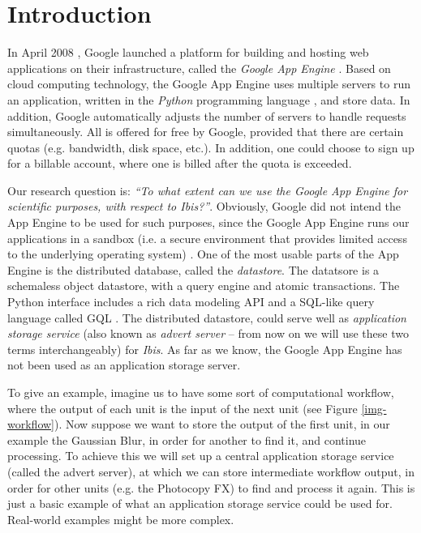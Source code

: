\section{Introduction}
\label{introduction}
In April 2008 \cite{app-engine-intro}, Google launched a platform for building
and hosting web applications on their infrastructure, called the \emph{Google App
Engine} \cite{app-engine-www}. Based on cloud computing technology, the Google
App Engine uses multiple servers to run an application, written in the
\emph{Python} programming language \cite{python-www}, and store data. In
addition, Google automatically adjusts the number of servers to handle requests
simultaneously. All is offered for free by Google, provided that there are
certain quotas (e.g. bandwidth, disk space, etc.). In addition, one could choose
to sign up for a billable account, where one is billed after the quota is
exceeded.

Our research question is: \emph{``To what extent can we use the Google App Engine
for scientific purposes, with respect to Ibis?''}. Obviously, Google did not
intend the App Engine to be used for such purposes, since the Google App Engine
runs our applications in a sandbox (i.e. a secure environment that provides
limited access to the underlying operating system) \cite{app-engine-sandbox}. One
of the most usable parts of the App Engine is the distributed database, called
the \emph{datastore}. The datatsore is a schemaless object datastore, with a
query engine and atomic transactions. The Python interface includes a rich data
modeling API and a SQL-like query language called GQL
\cite{app-engine-datastore}. The distributed datastore, could serve well as
\emph{application storage service} (also known as \emph{advert server} -- from
now on we will use these two terms interchangeably) for \emph{Ibis}. As far as we
know, the Google App Engine has not been used as an application storage server.

To give an example, imagine us to have some sort of computational workflow, where
the output of each unit is the input of the next unit (see Figure
\ref{img-workflow}). Now suppose we want to store the output of the first unit,
in our example the Gaussian Blur, in order for another to find it, and continue
processing. To achieve this we will set up a central application storage service
(called the advert server), at which we can store intermediate workflow output,
in order for other units (e.g. the Photocopy FX) to find and process it again.
This is just a basic example of what an application storage service could be used
for. Real-world examples might be more complex.

